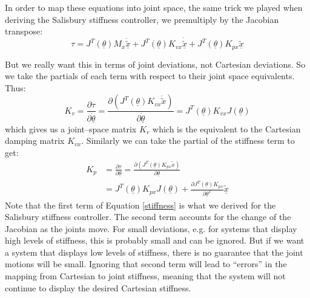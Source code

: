 \documentclass[]{article}
\begin{document}
In order to map these equations into joint space, the same trick we played when deriving the Salisbury stiffness controller, we premultiply by the Jacobian transpose:
\begin{equation}
 \tau = J^{T}(\underline{\theta})M_{x} \ddot{\tilde{\underline{x}}} + J^{T}(\underline{\theta})K_{vx}\dot{\tilde{\underline{x}}} + J^{T}(\underline{\theta})K_{px}\tilde{ \underline{x}}
\end{equation}

But we really want this in terms of joint deviations, not Cartesian deviations. So we take the partials of each term with respect to their joint space equivalents. Thus:
\begin{equation}
 K_{v} = \frac{\partial \tau}{\partial\underline{\dot{\theta}}} = \frac{\partial( J^{T}(\underline{\theta})K_{vx}\dot{\tilde{x}})}{\partial\underline{\dot{\theta}}} = J^{T}(\underline{\theta})K_{vx}J(\underline{\theta}) \label{damping}
\end{equation}
which gives us a joint--space matrix $K_{v}$ which is the equivalent to the Cartesian damping matrix $K_{vx}$. Similarly we can take the partial of the stiffness term to get:
\begin{equation}
\begin{split}
    K_{p} & = \frac{\partial \tau}{\partial\underline{\theta}} = \frac{\partial ( J^{T}(\underline{\theta})K_{px}\tilde{x})}{\partial\underline{\theta}}\\ & = J^{T}(\underline{\theta})K_{px}J(\underline{\theta}) + \frac{\partial J^{T}(\underline{\theta})K_{px}}{\partial \underline{\theta}^{T}}\tilde{\underline{x}} \label{stiffness}
\end{split}
\end{equation}
Note that the first term of Equation \ref{stiffness} is what we derived for the Salisbury stiffness controller. The second term accounts for the change of the Jacobian as the joints move. For small deviations, e.g. for systems that display high levels of stiffness, this is probably small and can be ignored. But if we want a system that displays low levels of stiffness, there is no guarantee that the joint motions will be small. Ignoring that second term will lead to ``errors'' in the mapping from Cartesian to joint stiffness, meaning that the system will not continue to display the desired Cartesian stiffness.
\end{document}

